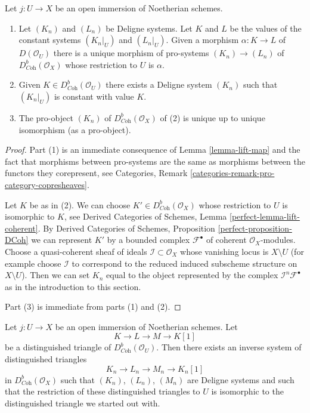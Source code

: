\begin{lemma}
\label{lemma-extension-by-zero}
Let $j : U \to X$ be an open immersion of Noetherian schemes.
\begin{enumerate}
\item Let $(K_n)$ and $(L_n)$ be Deligne systems.
Let $K$ and $L$ be the values of the constant systems
$(K_n|_U)$ and $(L_n|_U)$. Given a morphism $\alpha : K \to L$
of $D(\mathcal{O}_U)$
there is a unique morphism of pro-systems $(K_n) \to (L_n)$
of $D^b_{\textit{Coh}}(\mathcal{O}_X)$ whose restriction to $U$ is $\alpha$.
\item Given $K \in D^b_{\textit{Coh}}(\mathcal{O}_U)$ there exists a
Deligne system $(K_n)$ such that $(K_n|_U)$ is constant
with value $K$.
\item The pro-object $(K_n)$ of $D^b_{\textit{Coh}}(\mathcal{O}_X)$
of (2) is unique up to unique isomorphism (as a pro-object).
\end{enumerate}
\end{lemma}

\begin{proof}
Part (1) is an immediate consequence of Lemma \ref{lemma-lift-map}
and the fact that morphisms between pro-systems are
the same as morphisms between the functors they corepresent, see
Categories, Remark \ref{categories-remark-pro-category-copresheaves}.

\medskip\noindent
Let $K$ be as in (2). We can choose $K' \in D^b_{\textit{Coh}}(\mathcal{O}_X)$
whose restriction to $U$ is isomorphic to $K$, see
Derived Categories of Schemes, Lemma \ref{perfect-lemma-lift-coherent}.
By Derived Categories of Schemes, Proposition \ref{perfect-proposition-DCoh}
we can represent $K'$ by a bounded complex $\mathcal{F}^\bullet$
of coherent $\mathcal{O}_X$-modules. Choose a quasi-coherent sheaf
of ideals $\mathcal{I} \subset \mathcal{O}_X$ whose vanishing
locus is $X \setminus U$ (for example choose $\mathcal{I}$ to correspond
to the reduced induced subscheme structure on $X \setminus U$).
Then we can set $K_n$ equal to the object represented by the complex
$\mathcal{I}^n\mathcal{F}^\bullet$ as in the introduction
to this section.

\medskip\noindent
Part (3) is immediate from parts (1) and (2).
\end{proof}

\begin{lemma}
\label{lemma-extension-by-zero-triangle}
Let $j : U \to X$ be an open immersion of Noetherian schemes. Let
$$
K \to L \to M \to K[1]
$$
be a distinguished triangle of $D^b_{\textit{Coh}}(\mathcal{O}_U)$.
Then there exists an inverse system of distinguished triangles
$$
K_n \to L_n \to M_n \to K_n[1]
$$
in $D^b_{\textit{Coh}}(\mathcal{O}_X)$ such that $(K_n)$, $(L_n)$, $(M_n)$
are Deligne systems and such that the restriction of these
distinguished triangles to $U$ is isomorphic to the distinguished triangle
we started out with.
\end{lemma}

